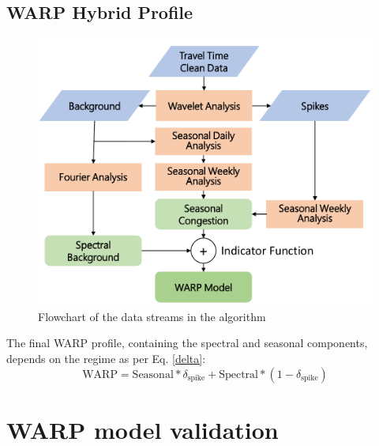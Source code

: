 \documentclass[a4paper, 10pt, conference]{ieeeconf}      %
\begin{document}
\subsection{WARP Hybrid Profile}
\begin{figure}[htbp]
	\centerline{\includegraphics[width=\linewidth]{./images/flow_warp_crop.pdf}}
	\caption{Flowchart of the data streams in the algorithm}
	\label{fig:dataflow}
\end{figure}
The final WARP profile, containing the spectral and seasonal components, depends on the regime as per Eq. \ref{delta}:
\begin{equation}
\textrm{WARP} = \textrm{Seasonal} * \delta_{\textrm{spike}} + \textrm{Spectral} * (1 - \delta_{\textrm{spike}})
\end{equation}

\section{WARP model validation}
\end{document}
